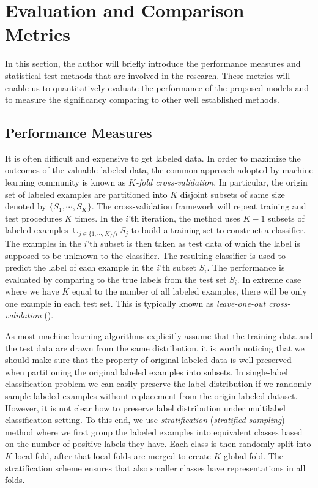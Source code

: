 {%
%
\chapter{Evaluation and Comparison Metrics} \label{sc_ecm}

In this section, the author will briefly introduce the performance measures and statistical test methods that are involved in the research. 
These metrics will enable us to quantitatively evaluate the performance of the proposed models and to measure the significancy comparing to other well established methods.

%
\section{Performance Measures} \label{sc_pm}

It is often difficult and expensive to get labeled data. 
In order to maximize the outcomes of the valuable labeled data, the common approach adopted by machine learning community is known as \textit{$K$-fold cross-validation}.
In particular, the origin set of labeled examples are partitioned into $K$ disjoint subsets of same size denoted by $\{S_1,\cdots,S_K\}$.
The cross-validation framework will repeat training and test procedures $K$ times.
In the $i$'th iteration, the method uses $K-1$ subsets of labeled examples $\cup_{j\in\{1,\cdots,K\}/i}S_j$ to build a training set to construct a classifier.
The examples in the $i$'th subset is then taken as test data of which the label is supposed to be unknown to the classifier.
The resulting classifier is used to predict the label of each example in the $i$'th subset $S_i$.
The performance is evaluated by comparing to the true labels from the test set $S_i$.
In extreme case where we have $K$ equal to the number of all labeled examples, there will be only one example in each test set.
This is typically known as \textit{leave-one-out cross-validation} (\loo).

As most machine learning algorithms explicitly assume that the training data and the test data are drawn from the same distribution,
it is worth noticing that we should make sure that the property of original labeled data is well preserved when partitioning the original labeled examples into subsets.
In single-label classification problem we can easily preserve the label distribution if we randomly sample labeled examples without replacement from the origin labeled dataset.
However, it is not clear how to preserve label distribution under multilabel classification setting.
To this end, we use \textit{stratification} (\textit{stratified sampling}) method where we first group the labeled examples into equivalent classes based on the number of positive labels they have. 
Each class is then randomly split into $K$ local fold, after that local folds are merged to create $K$ global fold.
The stratification scheme ensures that also smaller classes have representations in all folds. 

}
